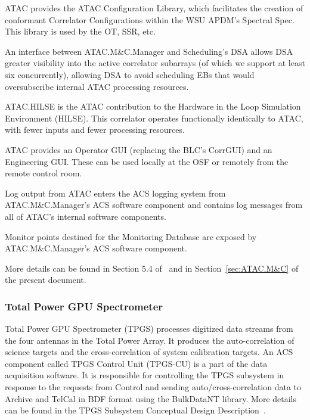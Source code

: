 ATAC provides the ATAC Configuration Library, which facilitates the creation of conformant Correlator Configurations within the WSU APDM's Spectral Spec. This library is used by the \ac{OT}, \ac{SSR}, etc.

An interface between ATAC.M\&C.Manager and Scheduling's DSA allows DSA greater visibility into the active correlator subarrays (of which we support at least six concurrently), allowing DSA to avoid scheduling EBs that would oversubscribe internal ATAC processing resources.

ATAC.HILSE is the ATAC contribution to the Hardware in the Loop Simulation Environment (HILSE). This correlator operates functionally identically to ATAC, with fewer inputs and fewer processing resources.

ATAC provides an Operator GUI (replacing the BLC's CorrGUI) and an Engineering GUI. These can be used locally at the OSF or remotely from the remote control room.

Log output from ATAC enters the ACS logging system from ATAC.M\&C.Manager's ACS software component and contains log messages from all of ATAC's internal software components.

Monitor points destined for the Monitoring Database are exposed by ATAC.M\&C.Manager's ACS software component.

More details can be found in Section 5.4 of~\cite{atac_sdd_dd-1} and in Section~\ref{sec:ATAC.M&C} of the present document. 


\subsubsection{Total Power GPU Spectrometer}
Total Power GPU Spectrometer (TPGS) processes digitized data streams from the four antennas in the Total Power Array. It produces the auto-correlation of science targets and the cross-correlation of system calibration targets. An ACS component called TPGS Control Unit (TPGS-CU) is a part of the data acquisition software. It is responsible for controlling the TPGS subsystem in response to the requests from Control and sending auto/cross-correlation data to Archive and TelCal in BDF format using the BulkDataNT library. More details can be found in the TPGS Subsystem Conceptual Design Description~\cite{TPGS_cosdd}.


